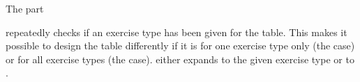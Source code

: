 \documentclass{xsim-manual}
\begin{document}
\begin{sourcecode}
\end{sourcecode}

The part
\begin{sourcecode}
\end{sourcecode}
repeatedly checks if an exercise type has been given for the table.  This
makes it possible to design the table differently if it is for one exercise
type only (the  case) or for all exercise types (the 
case).   either expands to the given
exercise type or to .
\end{document}
